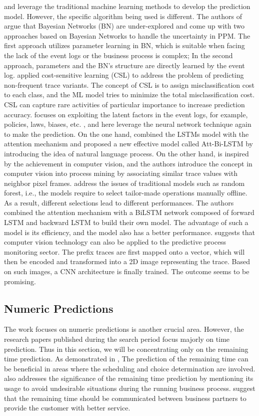 \documentclass[runningheads]{llncs}
\begin{document}
		\cite{art-4} and \cite{art-26} leverage the traditional machine learning methods to develop the prediction model. However, the specific algorithm being used is different. The authors of \cite{art-4} argue that Bayesian Networks (BN) are under-explored and come up with two approaches based on Bayesian Networks to handle the uncertainty in PPM. The first approach utilizes parameter learning in BN, which is suitable when facing the lack of the event logs or the business process is complex; In the second approach, parameters and the BN's structure are directly learned by the event log. \cite{art-26} applied cost-sensitive learning (CSL) to address the problem of predicting non-frequent trace variants. The concept of CSL is to assign misclassification cost to each class, and the ML model tries to minimize the total misclassification cost. CSL can capture rare activities of particular importance to increase prediction accuracy. \cite{art-8} focuses on exploiting the latent factors in the event logs, for example, policies, laws, biases, etc. \cite{art-9}, and \cite{art-12} here leverage the neural network technique again to make the prediction. On the one hand, \cite{art-9} combined the LSTMs model with the attention mechanism and proposed a new effective model called  Att-Bi-LSTM by introducing the idea of natural language process. On the other hand, \cite{art-12} is inspired by the achievement in computer vision, and the authors introduce the concept in computer vision into process mining by associating similar trace values with neighbor pixel frames. \cite{art-9} address the issues of traditional models such as random forest, i.e., the models require to select tailor-made operations manually offline. As a result, different selections lead to different performances. The authors combined the attention mechanism with a BiLSTM network composed of forward LSTM and backward LSTM to build their own model. The advantage of such a model is its efficiency, and the model also has a better performance. \cite{art-12} suggests that computer vision technology can also be applied to the predictive process monitoring sector. The prefix traces are first mapped onto a vector, which will then be encoded and transformed into a 2D image representing the trace. Based on such images, a CNN architecture is finally trained. The outcome seems to be promising. 
		
		\subsection{Numeric Predictions}
		The work focuses on numeric predictions is another crucial area. However, the research papers published during the search period focus majorly on time prediction. Thus in this section, we will be concentrating only on the remaining time prediction. As demonstrated in \cite{art-13}, The prediction of the remaining time can be beneficial in areas where the scheduling and choice determination are involved. \cite{art-15} also addresses the significance of the remaining time prediction by mentioning its usage to avoid undesirable situations during the running business process. \cite{art-29} suggest that the remaining time should be communicated between business partners to provide the customer with better service. 
		
\end{document}
